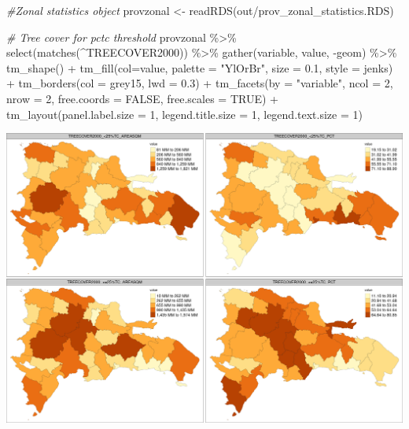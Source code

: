 \documentclass[10pt,landscape,a3paper]{article}
\newenvironment{Shaded}{\begin{snugshade}}{\end{snugshade}}
\newcommand{\AttributeTok}[1]{\textcolor[rgb]{0.77,0.63,0.00}{#1}}
\newcommand{\CommentTok}[1]{\textcolor[rgb]{0.56,0.35,0.01}{\textit{#1}}}
\newcommand{\ConstantTok}[1]{\textcolor[rgb]{0.00,0.00,0.00}{#1}}
\newcommand{\DecValTok}[1]{\textcolor[rgb]{0.00,0.00,0.81}{#1}}
\newcommand{\FloatTok}[1]{\textcolor[rgb]{0.00,0.00,0.81}{#1}}
\newcommand{\FunctionTok}[1]{\textcolor[rgb]{0.00,0.00,0.00}{#1}}
\newcommand{\NormalTok}[1]{#1}
\newcommand{\OtherTok}[1]{\textcolor[rgb]{0.56,0.35,0.01}{#1}}
\newcommand{\SpecialCharTok}[1]{\textcolor[rgb]{0.00,0.00,0.00}{#1}}
\newcommand{\StringTok}[1]{\textcolor[rgb]{0.31,0.60,0.02}{#1}}
\begin{document}
\begin{Shaded}
\begin{Highlighting}[]
\CommentTok{\#Zonal statistics object}
\NormalTok{provzonal }\OtherTok{\textless{}{-}} \FunctionTok{readRDS}\NormalTok{(}\StringTok{\textquotesingle{}out/prov\_zonal\_statistics.RDS\textquotesingle{}}\NormalTok{)}

\CommentTok{\# Tree cover for pctc threshold}
\NormalTok{provzonal }\SpecialCharTok{\%\textgreater{}\%} \FunctionTok{select}\NormalTok{(}\FunctionTok{matches}\NormalTok{(}\StringTok{\textquotesingle{}\^{}TREECOVER2000\textquotesingle{}}\NormalTok{)) }\SpecialCharTok{\%\textgreater{}\%}
  \FunctionTok{gather}\NormalTok{(variable, value, }\SpecialCharTok{{-}}\NormalTok{geom) }\SpecialCharTok{\%\textgreater{}\%}
  \FunctionTok{tm\_shape}\NormalTok{() }\SpecialCharTok{+}
    \FunctionTok{tm\_fill}\NormalTok{(}\AttributeTok{col=}\StringTok{\textquotesingle{}value\textquotesingle{}}\NormalTok{, }\AttributeTok{palette =} \StringTok{"YlOrBr"}\NormalTok{, }\AttributeTok{size =} \FloatTok{0.1}\NormalTok{, }\AttributeTok{style =} \StringTok{\textquotesingle{}jenks\textquotesingle{}}\NormalTok{) }\SpecialCharTok{+}
    \FunctionTok{tm\_borders}\NormalTok{(}\AttributeTok{col =} \StringTok{\textquotesingle{}grey15\textquotesingle{}}\NormalTok{, }\AttributeTok{lwd =} \FloatTok{0.3}\NormalTok{) }\SpecialCharTok{+}
    \FunctionTok{tm\_facets}\NormalTok{(}\AttributeTok{by =} \StringTok{"variable"}\NormalTok{, }\AttributeTok{ncol =} \DecValTok{2}\NormalTok{, }\AttributeTok{nrow =} \DecValTok{2}\NormalTok{, }\AttributeTok{free.coords =} \ConstantTok{FALSE}\NormalTok{, }\AttributeTok{free.scales =} \ConstantTok{TRUE}\NormalTok{) }\SpecialCharTok{+}
    \FunctionTok{tm\_layout}\NormalTok{(}\AttributeTok{panel.label.size =} \DecValTok{1}\NormalTok{, }\AttributeTok{legend.title.size =} \DecValTok{1}\NormalTok{, }\AttributeTok{legend.text.size =} \DecValTok{1}\NormalTok{)}
\end{Highlighting}
\end{Shaded}

\begin{center}\includegraphics{img/data-download-preparation-eda/zonal-prov-1} \end{center}
\end{document}
